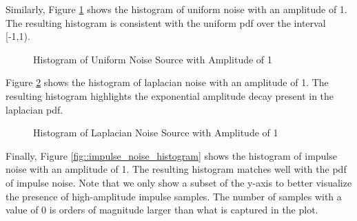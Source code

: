 \documentclass{article}
\begin{document}
Similarly, Figure \ref{fig::uniform_noise_histogram} shows the histogram of uniform noise with an amplitude of 1. The resulting histogram is consistent with the uniform pdf over the interval [-1,1).

\begin{figure}[H]
	\centerline{}
	\caption{Histogram of Uniform Noise Source with Amplitude of 1}
	\label{fig::uniform_noise_histogram}
\end{figure}

Figure \ref{fig::laplacian_noise_histogram} shows the histogram of laplacian noise with an amplitude of 1. The resulting histogram highlights the exponential amplitude decay present in the laplacian pdf.

\begin{figure}[H]
	\centerline{}
	\caption{Histogram of Laplacian Noise Source with Amplitude of 1}
	\label{fig::laplacian_noise_histogram}
\end{figure}

Finally, Figure \ref{fig::impulse_noise_histogram} shows the histogram of impulse noise with an amplitude of 1. The resulting histogram matches well with the pdf of impulse noise. Note that we only show a subset of the y-axis to better visualize the presence of high-amplitude impulse samples. The number of samples with a value of 0 is orders of magnitude larger than what is captured in the plot. 
\end{document}

